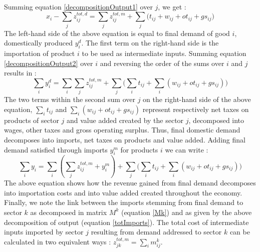\documentclass[12pt,english]{article}
\begin{document}
Summing equation \ref{decompositionOutput1} over $j$, we get :
\begin{equation}
x_i - \sum_j z^{tot,d}_{ij}  = \sum_j z^{tot,m}_{ij} + \sum_j \big(t_{ij} + w_{ij} + ot_{ij} + gs_{ij}\big) \label{decompositionOutput2}
\end{equation}
The left-hand side of the above equation is equal to final demand of good $i$, domestically produced $y^d_i$. The first term on the right-hand side is the importation of product $i$ to be used as intermediate inputs. %
Summing equation \ref{decompositionOutput2} over $i$ and reversing the order of the sums over $i$ and $j$ results in :
\begin{equation}
\sum_i y^d_i  = \sum_{i}\sum_{j} z^{tot,m}_{ij} + \sum_j \big( \sum_i t_{ij} + \sum_i (w_{ij} + ot_{ij} + gs_{ij})\big) \label{decompositionOutput3}
\end{equation}
The two terms within the second sum over $j$ on the right-hand side of the above equation, $\sum_i t_{ij}$ and $\sum_i (w_{ij} + ot_{ij} + gs_{ij})$ represent respectively net taxes on products of sector $j$ and value added created by the sector $j$, decomposed into wages, other taxes and gross operating surplus. Thus, final domestic demand decomposes into imports, net taxes on products and value added. Adding final demand satisfied through imports $y^m_i$ for products $i$ we can write :
\begin{equation}
\sum_i y_i =  \sum_i (\sum_{j} z^{tot,m}_{ij} + y^m_i) + \sum_j \big( \sum_i t_{ij} + \sum_i (w_{ij} + ot_{ij} + gs_{ij})\big) \label{decompositionOutput4}
\end{equation}
The above equation shows how the revenue gained from final demand decomposes into importation costs and into value added created throughout the economy. Finally, we note the link between the imports stemming from final demand to sector $k$ as decomposed in matrix $M^k$ (equation \ref{Mk}) and as given by the above decomposition of output (equation \ref{totImports}). The total cost of intermediate inputs imported by sector $j$ resulting from demand addressed to sector $k$ can be calculated in two equivalent ways : $z^{tot,m}_{jk} = \sum_i m_{ij}^k$. %
\end{document}
